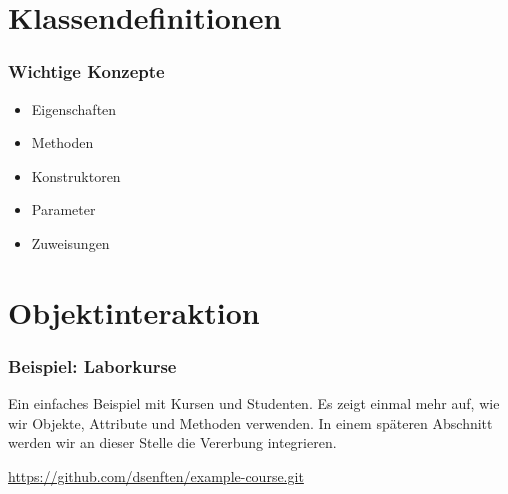 
\section{Klassendefinitionen}
\label{sec:class-definitions}

\begin{frame}[fragile]
    \frametitle<presentation>{Wichtige Konzepte}

    \begin{itemize}
        \item Eigenschaften
        \item Methoden
        \item Konstruktoren
        \item Parameter
        \item Zuweisungen
    \end{itemize}

\end{frame}



\section{Objektinteraktion}
\label{sec:interaction}


\begin{frame}[fragile]
    \frametitle<presentation>{Beispiel: Laborkurse}
    Ein einfaches Beispiel mit Kursen und Studenten. Es zeigt einmal mehr auf, wie wir
    Objekte, Attribute und Methoden verwenden. In einem späteren Abschnitt werden wir
    an dieser Stelle die Vererbung integrieren.

    \href{https://github.com/dsenften/example-course.git}
         {https://github.com/dsenften/example-course.git}

\end{frame}


